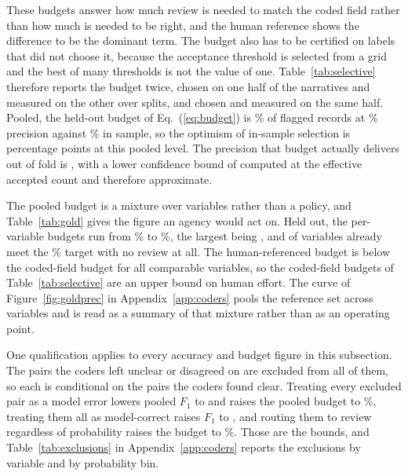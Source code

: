 These budgets answer how much review is needed to match the coded field rather than how much is
needed to be right, and the human reference shows the difference to be the dominant term. The
budget also has to be certified on labels that did not choose it, because the acceptance
threshold is selected from a grid and the best of many thresholds is not the value of one.
Table~\ref{tab:selective} therefore reports the budget twice, chosen on one half of the
narratives and measured on the other over \GoldBudgetNSplits{} splits, and chosen and measured
on the same half. Pooled, the held-out budget of Eq.~(\ref{eq:budget}) is \GoldBudgetNinety\%
of flagged records at \PrecTargetNinety\% precision against \GoldBudgetNinetyInSample\% in
sample, so the optimism of in-sample selection is \GoldBudgetOptimism{} percentage points at
this pooled level. The precision that budget actually delivers out of fold is
\GoldBudgetPrecHeldOut{}, with a lower confidence bound of \GoldBudgetPrecLCB{} computed at the
effective accepted count and therefore approximate.

The pooled budget is a mixture over variables rather than a policy, and Table~\ref{tab:gold}
gives the figure an agency would act on. Held out, the per-variable budgets run from
\GoldBudgetPerVarLo\% to \GoldBudgetPerVarHi\%, the largest being \GoldBudgetMaxVar{}, and
\GoldNZeroBudget{} of \GoldNVars{} variables already meet the \PrecTargetNinety\% target with
no review at all. The human-referenced budget is below the coded-field budget for all
\BudgetLowerN{} comparable variables, so the coded-field budgets of Table~\ref{tab:selective}
are an upper bound on human effort. The curve of Figure~\ref{fig:goldprec} in
Appendix~\ref{app:coders} pools the reference set across variables and is read as a summary of
that mixture rather than as an operating point.

One qualification applies to every accuracy and budget figure in this subsection. The
\ExclN{} pairs the coders left unclear or disagreed on are excluded from all of them, so each
is conditional on the pairs the coders found clear. Treating every excluded pair as a model
error lowers pooled $F_1$ to \ExclFoneError{} and raises the pooled budget to
\ExclBudgetError\%, treating them all as model-correct raises $F_1$ to \ExclFoneCorrect{}, and
routing them to review regardless of probability raises the budget to \ExclBudgetReview\%.
Those are the bounds, and Table~\ref{tab:exclusions} in Appendix~\ref{app:coders} reports the
exclusions by variable and by probability bin.

